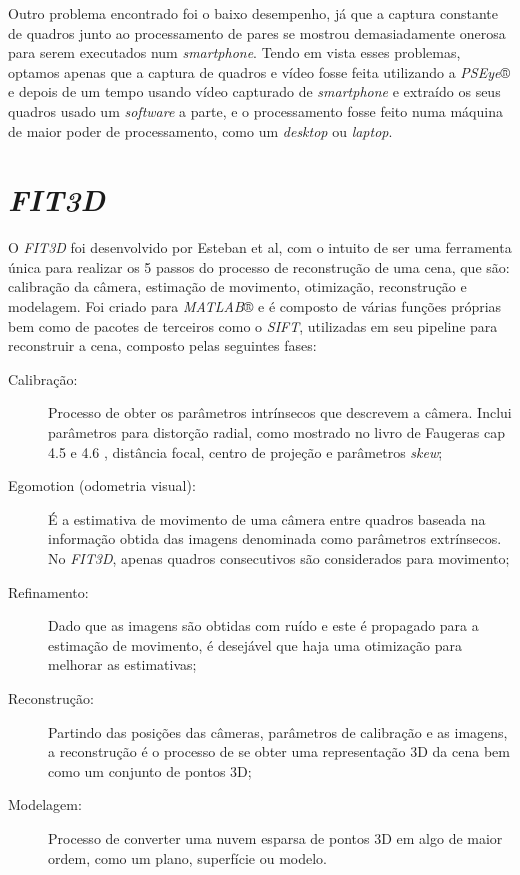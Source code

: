 Outro problema encontrado foi o baixo desempenho, já que a captura constante de quadros junto ao processamento de pares se mostrou demasiadamente onerosa para serem executados num \textit{smartphone}. Tendo em vista esses problemas, optamos  apenas que a captura de quadros e vídeo fosse feita utilizando a \textit{PSEye}® e depois de um tempo usando vídeo capturado de \textit{smartphone} e extraído os seus quadros usado um \textit{software} a parte, e o processamento fosse feito numa máquina de maior poder de processamento, como um \textit{desktop} ou \textit{laptop}.

\section{\textit{FIT3D}}
O \textit{FIT3D} foi desenvolvido por Esteban et al\cite{FIT3D}, com o intuito de ser uma ferramenta única para realizar os 5 passos do processo de reconstrução de uma cena, que são: calibração da câmera, estimação de movimento, otimização, reconstrução e modelagem. Foi criado para \textit{MATLAB}® e é composto de várias funções próprias bem como de pacotes de terceiros como o \textit{SIFT}, utilizadas em seu pipeline para reconstruir a cena, composto pelas seguintes fases:
\begin{description}
	\item[Calibração: ]{Processo de obter os parâmetros intrínsecos que descrevem a câmera. Inclui parâmetros para distorção radial, como mostrado no livro de Faugeras cap 4.5 e 4.6 \cite{Faugeras-Geometry}, distância focal, centro de projeção e parâmetros \textit{skew};}
	\item[Egomotion (odometria visual): ]{É a estimativa de movimento de uma câmera entre quadros baseada na informação obtida das imagens denominada como parâmetros extrínsecos. No \textit{FIT3D}, apenas quadros consecutivos são considerados para movimento;}
	\item[Refinamento: ]{Dado que as imagens são obtidas com ruído e este é propagado para a estimação de movimento, é desejável que haja uma otimização para melhorar as estimativas;}
	\item[Reconstrução: ]{Partindo das posições das câmeras, parâmetros de calibração e as imagens, a reconstrução é o processo de se obter uma representação 3D da cena bem como um conjunto de pontos 3D;}
	\item[Modelagem: ]{Processo de converter uma nuvem esparsa de pontos 3D em algo de maior ordem, como um plano, superfície ou modelo.}
\end{description}

